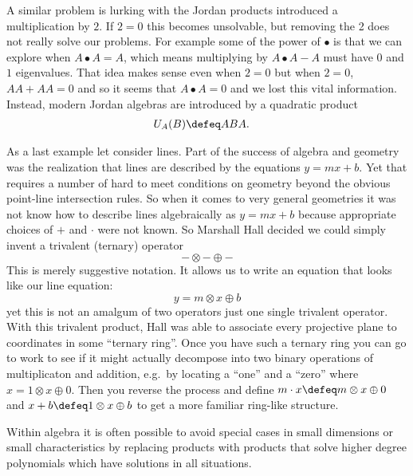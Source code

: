 A similar problem is lurking with  the Jordan products introduced a multiplication by $2$.
If $2=0$ this becomes unsolvable, but removing the 2 does not really solve 
our problems.  For example some of the power of $\bullet$ is that we 
can explore when $A\bullet A=A$, which means multiplying by $A\bullet A-A$ 
must have $0$ and $1$ eigenvalues.  That idea makes sense even when $2=0$ 
but when $2=0$, $AA+AA=0$ and so it seems that $A\bullet A=0$ and we lost 
this vital information.  Instead, modern Jordan algebras are introduced by 
a quadratic product 
\begin{align*}
    U_A(B) & \defeq ABA.
\end{align*}

As a last example let consider lines.   Part of the success of algebra and 
geometry was the realization that lines are described by the equations $y=mx+b$.
Yet that requires a number of hard to meet conditions on geometry beyond the obvious 
point-line intersection rules.  So when it comes to very general geometries 
it was not know how to describe lines algebraically as $y=mx+b$ because 
appropriate choices of $+$ and $\cdot$ were not known.
So Marshall Hall decided we could simply invent a trivalent (ternary) operator
\[
    -\otimes-\oplus -
\]
This is merely suggestive notation.  It allows us to write an equation 
that looks like our line equation:
\[
    y=m\otimes x\oplus b
\] 
yet this is not an amalgum of two operators just one single trivalent operator.
With this trivalent product, Hall was able to associate every 
projective plane to coordinates in some ``ternary ring''.  Once you have such a ternary ring you 
can go to work to see if it might actually decompose into two binary operations of multiplicaton 
and addition, e.g.\ by locating a ``one'' and a ``zero'' where $x=1\otimes x\oplus 0$.  Then 
you reverse the process and define $m\cdot x\defeq m\otimes x\oplus 0$ and $x+b\defeq 1\otimes x\oplus b$
to get a more familiar ring-like structure.


Within algebra it is often possible to avoid special cases in small dimensions 
or small characteristics by replacing products with products that solve higher 
degree polynomials which have solutions in all situations.  
